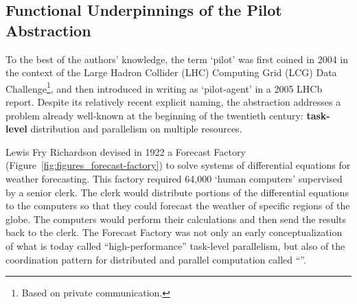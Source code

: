 \documentclass{sig-alternate}
\begin{document}

  


\subsection{Functional Underpinnings of the Pilot Abstraction}
\label{sec:histabstr}

To the best of the authors' knowledge, the term `pilot' was first coined in
2004 in the context of the Large Hadron Collider (LHC) Computing Grid (LCG) Data
Challenge\footnote{Based on private communication.}, and then introduced in
writing as `pilot-agent' in a 2005 LHCb report\cite{lhcb2005}. Despite its
relatively recent explicit naming, the \pilot abstraction addresses a problem
already well-known at the beginning of the twentieth century: {\bf task-level}
distribution and parallelism on multiple resources.

Lewis Fry Richardson devised in 1922 a Forecast Factory
(Figure~\ref{fig:figures_forecast-factory}) to solve systems of differential
equations for weather forecasting. This factory required 64,000 `human
computers' supervised by a senior clerk. The clerk would distribute portions of
the differential equations to the computers so that they could forecast the
weather of specific regions of the globe. The computers would perform their
calculations and then send the results back to the clerk. The Forecast Factory
was not only an early conceptualization of what is today called
``high-performance'' task-level parallelism, but also of the coordination
pattern for distributed and parallel computation called ``\MW''.
\end{document}
